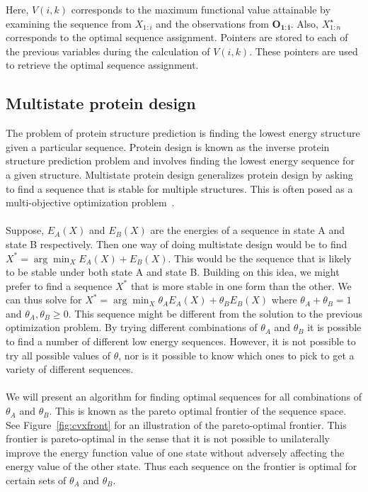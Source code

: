 \documentclass{article}
\begin{document}
Here, $V(i,k)$ corresponds to the maximum functional value attainable by examining the sequence from $X_{1:i}$ and the observations from $\mathbf{O_{1:i}}$. Also, $X^\star_{1:n}$ corresponds to the optimal sequence assignment. Pointers are stored to each of the previous variables during the calculation of $V(i,k)$. These pointers are used to retrieve the optimal sequence assignment. 

\subsection{Multistate protein design}
The problem of protein structure prediction is finding the lowest energy structure given a particular sequence. Protein design is known as the inverse protein structure prediction problem and involves finding the lowest energy sequence for a given structure. Multistate protein design generalizes protein design by asking to find a sequence that is stable for multiple structures. This is often posed as a  multi-objective optimization problem~\cite{Zheng2009}.

\paragraph*{} Suppose, $E_A(X)$ and $E_B(X)$ are the energies of a sequence in state A and state B respectively. Then one way of doing multistate design would be to find $X^* = \arg \min_{X} E_A(X) + E_B(X)$. This would be the sequence that is likely to be stable under both state A and state B. Building on this idea, we might prefer to find a sequence $X^*$ that is more stable in one form than the other. We can thus solve for $X^* = \arg \min_{X} \theta_AE_A(X) + \theta_BE_B(X)$ where $\theta_A+\theta_B=1$ and $\theta_A,\theta_B \geq 0$. This sequence might be different from the solution to the previous optimization problem. By trying different combinations of $\theta_A$ and $\theta_B$ it is possible to find a number of different low energy sequences. However, it is not possible to try all possible values of $\theta$, nor is it possible to know which ones to pick to get a variety of different sequences.

\paragraph*{} We will present an algorithm for finding optimal sequences for all combinations of $\theta_A$ and $\theta_B$. This is known as the pareto optimal frontier of the sequence space. See Figure~\ref{fig:cvxfront} for an illustration of the pareto-optimal frontier. This frontier is pareto-optimal in the sense that it is not possible to unilaterally improve the energy function value of one state without adversely affecting the energy value of the other state. Thus each sequence on the frontier is optimal for certain sets of $\theta_A$ and $\theta_B$. 
\end{document}
